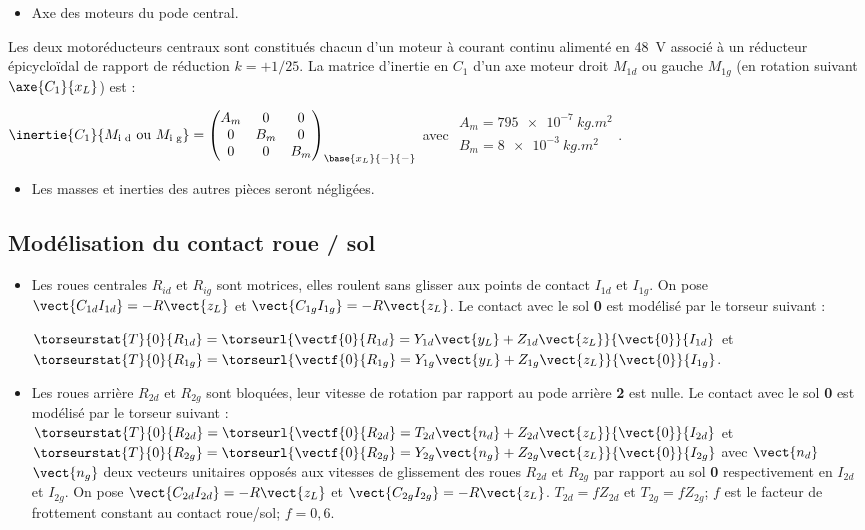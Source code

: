\begin{itemize}
\item Axe des moteurs du pode central.
\end{itemize}

Les deux motoréducteurs centraux sont constitués chacun d’un moteur à courant continu alimenté en \SI{48}{V} associé à
un réducteur épicycloïdal de rapport de réduction $k = +1/ 25$. La matrice d’inertie en $C_1$ d’un axe moteur droit $M_{1d}$ ou
gauche $M_{1g}$  (en rotation suivant $\axe{C_1}{x_L}$) est :

$\inertie{C_1}{M_{\text{i d}} \text{ ou } M_{\text{i g}}}=
\begin{pmatrix} 
A_m & 0 & 0 \\ 0 & B_m & 0 \\ 0 & 0 & B_m 
\end{pmatrix}_{\base{x_L}{-}{-}}$
avec 
$\begin{array}{l}
A_m =\SI{795e-7}{kg.m^2} \\
B_m =\SI{8e-3}{kg.m^2} \\
\end{array}$.

\begin{itemize}
\item Les masses et inerties des autres pièces seront négligées.
\end{itemize}

\subsection*{Modélisation du contact roue / sol}

\begin{itemize}
\item Les roues centrales $R_{id}$ et $R_{ig}$ sont motrices, elles roulent sans glisser aux points de contact $I_{1d}$ et $I_{1g}$. On pose $\vect{C_{1d}I_{1d}}=-R\vect{z_L}$ et $\vect{C_{1g}I_{1g}}=-R\vect{z_L}$. Le contact avec le sol \textbf{0} est modélisé par le torseur suivant :

$\torseurstat{T}{0}{R_{1d}}=\torseurl{\vectf{0}{R_{1d}}=Y_{1d}\vect{y_L}+Z_{1d}\vect{z_L}}{\vect{0}}{I_{1d}}$
et
$\torseurstat{T}{0}{R_{1g}}=\torseurl{\vectf{0}{R_{1g}}=Y_{1g}\vect{y_L}+Z_{1g}\vect{z_L}}{\vect{0}}{I_{1g}}$.

\item Les roues arrière $R_{2d}$ et $R_{2g}$ sont bloquées, leur vitesse de rotation par rapport au pode arrière \textbf{2} est nulle. Le contact avec le sol \textbf{0} est modélisé par le torseur suivant : 
$\torseurstat{T}{0}{R_{2d}}=\torseurl{\vectf{0}{R_{2d}}=T_{2d}\vect{n_d}+Z_{2d}\vect{z_L}}{\vect{0}}{I_{2d}}$
et
$\torseurstat{T}{0}{R_{2g}}=\torseurl{\vectf{0}{R_{2g}}=Y_{2g}\vect{n_g}+Z_{2g}\vect{z_L}}{\vect{0}}{I_{2g}}$
avec $\vect{n_d}$ $\vect{n_g}$ deux vecteurs unitaires opposés aux vitesses de glissement des roues $R_{2d}$ et $R_{2g}$ par rapport au sol \textbf{0}
respectivement en $I_{2d}$ et $I_{2g}$. On pose $\vect{C_{2d}I_{2d}}=-R\vect{z_L}$ et 
$\vect{C_{2g}I_{2g}}=-R\vect{z_L}$. $T_{2d}=fZ_{2d}$ et $T_{2g}=fZ_{2g}$; $f$ est le facteur de frottement constant au contact roue/sol; $f = 0,6$.
\end{itemize}


